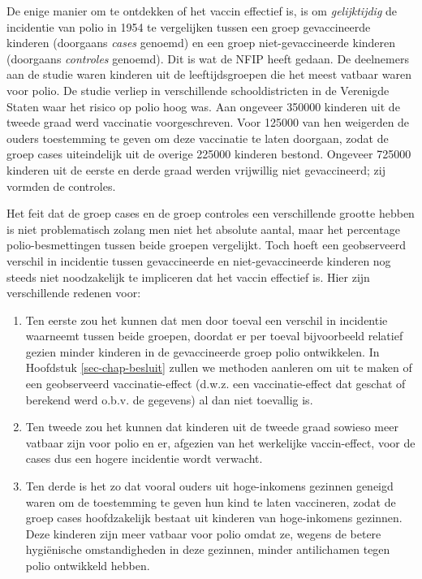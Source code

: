 \documentclass[
  dutch,
  letterpaper,
  12pt]{book}
\providecommand{\tightlist}{%
  \setlength{\itemsep}{0pt}\setlength{\parskip}{0pt}}
\theoremstyle{definition}
\theoremstyle{definition}
\theoremstyle{definition}
\theoremstyle{remark}
\begin{document}
De enige manier om te ontdekken of het vaccin effectief is, is om
\emph{gelijktijdig} de incidentie van polio in 1954 te vergelijken
tussen een groep gevaccineerde kinderen (doorgaans \emph{cases} genoemd)
en een groep niet-gevaccineerde kinderen (doorgaans \emph{controles}
genoemd). Dit is wat de NFIP heeft gedaan. De deelnemers aan de studie
waren kinderen uit de leeftijdsgroepen die het meest vatbaar waren voor
polio. De studie verliep in verschillende schooldistricten in de
Verenigde Staten waar het risico op polio hoog was. Aan ongeveer 350000
kinderen uit de tweede graad werd vaccinatie voorgeschreven. Voor 125000
van hen weigerden de ouders toestemming te geven om deze vaccinatie te
laten doorgaan, zodat de groep cases uiteindelijk uit de overige 225000
kinderen bestond. Ongeveer 725000 kinderen uit de eerste en derde graad
werden vrijwillig niet gevaccineerd; zij vormden de controles.

Het feit dat de groep cases en de groep controles een verschillende
grootte hebben is niet problematisch zolang men niet het absolute
aantal, maar het percentage polio-besmettingen tussen beide groepen
vergelijkt. Toch hoeft een geobserveerd verschil in incidentie tussen
gevaccineerde en niet-gevaccineerde kinderen nog steeds niet
noodzakelijk te impliceren dat het vaccin effectief is. Hier zijn
verschillende redenen voor:

\begin{enumerate}
\def\labelenumi{\arabic{enumi}.}
\tightlist
\item
  Ten eerste zou het kunnen dat men door toeval een verschil in
  incidentie waarneemt tussen beide groepen, doordat er per toeval
  bijvoorbeeld relatief gezien minder kinderen in de gevaccineerde groep
  polio ontwikkelen. In Hoofdstuk \ref{sec-chap-besluit} zullen we
  methoden aanleren om uit te maken of een geobserveerd
  vaccinatie-effect (d.w.z. een vaccinatie-effect dat geschat of
  berekend werd o.b.v. de gegevens) al dan niet toevallig is.
\item
  Ten tweede zou het kunnen dat kinderen uit de tweede graad sowieso
  meer vatbaar zijn voor polio en er, afgezien van het werkelijke
  vaccin-effect, voor de cases dus een hogere incidentie wordt verwacht.
\item
  Ten derde is het zo dat vooral ouders uit hoge-inkomens gezinnen
  geneigd waren om de toestemming te geven hun kind te laten vaccineren,
  zodat de groep cases hoofdzakelijk bestaat uit kinderen van
  hoge-inkomens gezinnen. Deze kinderen zijn meer vatbaar voor polio
  omdat ze, wegens de betere hygiënische omstandigheden in deze
  gezinnen, minder antilichamen tegen polio ontwikkeld hebben.
\end{enumerate}
\end{document}
